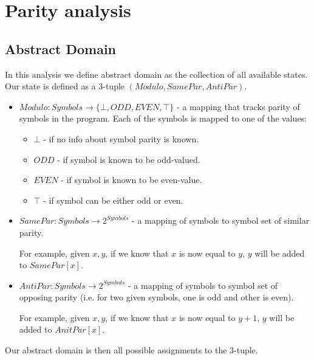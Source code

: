\section*{Parity analysis}
\subsection*{Abstract Domain}
In this analysis we define abstract domain as the collection of all available states. Our state is defined as a 3-tuple $(Modulo,SamePar,AntiPar)$.

\begin{itemize}
	\item $Modulo: Symbols \rightarrow \{\bot, ODD, EVEN, \top\}$ - a mapping that tracks parity of symbols in the program. Each of the symbols is mapped to one of the values:
	\begin{itemize}
		\item $\bot$ - if no info about symbol parity is known.
		\item $ODD$ - if symbol is known to be odd-valued.
		\item $EVEN$ - if symbol is known to be even-value.
		\item $\top$ - if symbol can be either odd or even.
	\end{itemize}
	\item $SamePar: Symbols \rightarrow 2^{Symbols}$ - a mapping of symbols to symbol set of similar parity.
	
	For example, given $x, y$, if we know that $x$ is now equal to $y$, $y$ will be added to $SamePar[x]$.
	
	\item $AntiPar: Symbols \rightarrow 2^{Symbols}$ - a mapping of symbols to symbol set of opposing parity (i.e. for two given symbols, one is odd and other is even).
	
	For example, given $x, y$, if we know that $x$ is now equal to $y + 1$, $y$ will be added to $AnitPar[x]$.
\end{itemize}
Our abstract domain is then all possible assignments to the 3-tuple.
